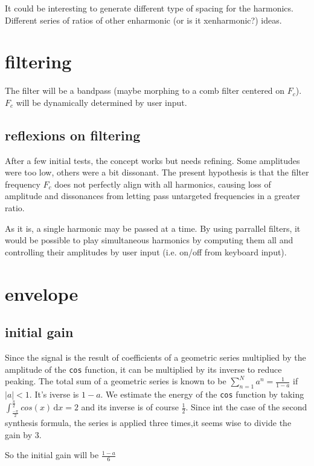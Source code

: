 \documentclass{article}
\begin{document}
It could be interesting to generate different type of spacing for the harmonics.
Different series of ratios of other enharmonic (or is it xenharmonic?) ideas.


\section{filtering}
The filter will be a bandpass (maybe morphing to a comb filter centered on $F_c$).
$F_c$ will be dynamically determined by user input. 

\subsection{reflexions on filtering}
After a few initial tests, the concept works but needs refining. Some amplitudes
were too low, others were a bit dissonant. The present hypothesis is that the
filter frequency $F_c$ does not perfectly align with all harmonics, causing loss
of amplitude and dissonances from letting pass untargeted frequencies in a 
greater ratio. 

As it is, a single harmonic may be passed at a time. By using parrallel filters, 
it would be possible to play simultaneous harmonics by computing them all and
controlling their amplitudes by user input (i.e. on/off from keyboard input).

\section{envelope}
\subsection{initial gain}
Since the signal is the result of coefficients of a geometric series multiplied
by the amplitude of the \texttt{cos} function, it can be multiplied by its 
inverse to reduce peaking. The total sum of a geometric series is known to be
$\sum\limits_{n=1}^N a^n = \frac{1}{1 - a}$ if $\left|a\right| < 1$. It's
iverse is $1 - a$. We estimate the energy of the \texttt{cos} function by
taking $\int_{\frac{-\pi}{2}}^{\frac{\pi}{2}} \! cos(x)\, \mathrm{d}x = 2$ and 
its inverse is of course $\frac{1}{2}$. Since int the case of the second
synthesis formula, the series is applied three times,it seems wise to divide 
the gain by 3.

So the initial gain will be $\frac{1-a}{6}$
\end{document}
